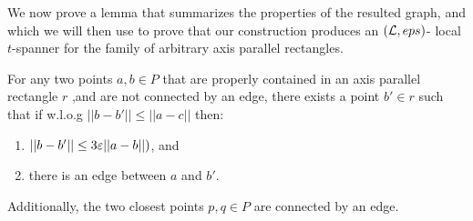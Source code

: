 \documentclass[12pt]{article}%
\begin{document}
We now prove a lemma that summarizes the properties of the resulted
graph, and which we will then use to prove that our construction
produces an $(\mathcal{L}, eps)$- local $t$-spanner for the family of
arbitrary axis parallel rectangles.


\begin{claim}
    \label{clm:span_properties}
    For any two points $a,b\in P$ that are properly contained in an
    axis parallel rectangle $r$ ,and are not connected by an edge,
    there exists a point $b'\in r$ such that if w.l.o.g
    $||b-b'|| \leq ||a-c||$ then:
    \begin{enumerate}
        \item $||b-b'|| \leq 3\varepsilon ||a-b||)$, and
        \item there is an edge between $a$ and $b'$.
    \end{enumerate}
    Additionally, the two closest points $p,q\in P$ are connected by
    an edge.
	
\end{claim}
\end{document}
